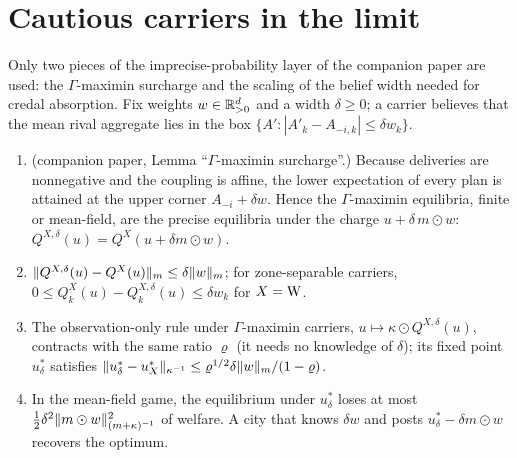\section{Cautious carriers in the limit}\label{sec:imprecise}

Only two pieces of the imprecise-probability layer of the companion paper are used: the $\Gamma$-maximin surcharge and the scaling of the belief width needed for credal absorption. Fix weights $w\in\mathbb{R}^d_{>0}$ and a width $\delta\ge0$; a carrier believes that the mean rival aggregate lies in the box $\{A':|A'_k-A_{-i,k}|\le\delta w_k\}$.

\begin{proposition}\label{prop:gamma}
\begin{enumerate}
\item[(a)] (companion paper, Lemma ``$\Gamma$-maximin surcharge''.) Because deliveries are nonnegative and the coupling is affine, the lower expectation of every plan is attained at the upper corner $A_{-i}+\delta w$. Hence the $\Gamma$-maximin equilibria, finite or mean-field, are the precise equilibria under the charge $u+\delta\,m\odot w$: $Q^{X,\delta}(u)=Q^X(u+\delta m\odot w)$.
\item[(b)] $\lVert Q^{X,\delta}(u)-Q^X(u)\rVert_m\le\delta\lVert w\rVert_m$; for zone-separable carriers, $0\le Q^X_k(u)-Q^{X,\delta}_k(u)\le\delta w_k$ for $X=\mathrm{W}$.
\item[(c)] The observation-only rule under $\Gamma$-maximin carriers, $u\mapsto\kappa\odot Q^{X,\delta}(u)$, contracts with the same ratio $\varrho$ (it needs no knowledge of $\delta$); its fixed point $u_\delta^*$ satisfies $\lVert u^*_\delta-u_X^*\rVert_{\kappa^{-1}}\le\varrho^{1/2}\delta\lVert w\rVert_m/(1-\varrho)$.
\item[(d)] In the mean-field game, the equilibrium under $u_\delta^*$ loses at most $\tfrac12\delta^2\lVert m\odot w\rVert_{(m+\kappa)^{-1}}^2$ of welfare. A city that knows $\delta w$ and posts $u_\delta^*-\delta m\odot w$ recovers the optimum.
\end{enumerate}
\end{proposition}
